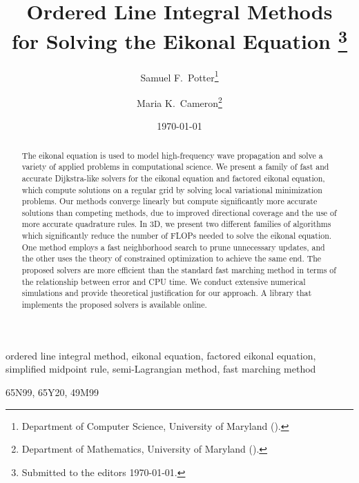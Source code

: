 \documentclass[eikonal.tex]{subfiles}
\begin{document}
\title{
  Ordered Line Integral Methods \\
  for Solving the Eikonal Equation
  \thanks{Submitted to the editors \today.}
}
\author{
  Samuel F.\ Potter\thanks{Department of Computer Science,
    University of Maryland ().}
  \and Maria K.\ Cameron\thanks{Department of Mathematics,
    University of Maryland ().}
}
\date{\today}

\maketitle

\begin{abstract}
  The eikonal equation is used to model high-frequency wave
  propagation and solve a variety of applied problems in computational
  science. We present a family of fast and accurate Dijkstra-like
  solvers for the eikonal equation and factored eikonal equation,
  which compute solutions on a regular grid by solving local
  variational minimization problems. Our methods converge linearly but
  compute significantly more accurate solutions than competing
  methods, due to improved directional coverage and the use of more
  accurate quadrature rules. In 3D, we present two different families
  of algorithms which significantly reduce the number of FLOPs needed
  to solve the eikonal equation. One method employs a fast
  neighborhood search to prune unnecessary updates, and the other uses
  the theory of constrained optimization to achieve the same end. The
  proposed solvers are more efficient than the standard fast marching
  method in terms of the relationship between error and CPU time. We
  conduct extensive numerical simulations and provide theoretical
  justification for our approach. A library that implements the
  proposed solvers is available online.
\end{abstract}

\begin{keywords}
  ordered line integral method, eikonal equation, factored eikonal
  equation, simplified midpoint rule, semi-Lagrangian method, fast
  marching method
\end{keywords}

\begin{AMS}
  65N99, 65Y20, 49M99
\end{AMS}
\end{document}
